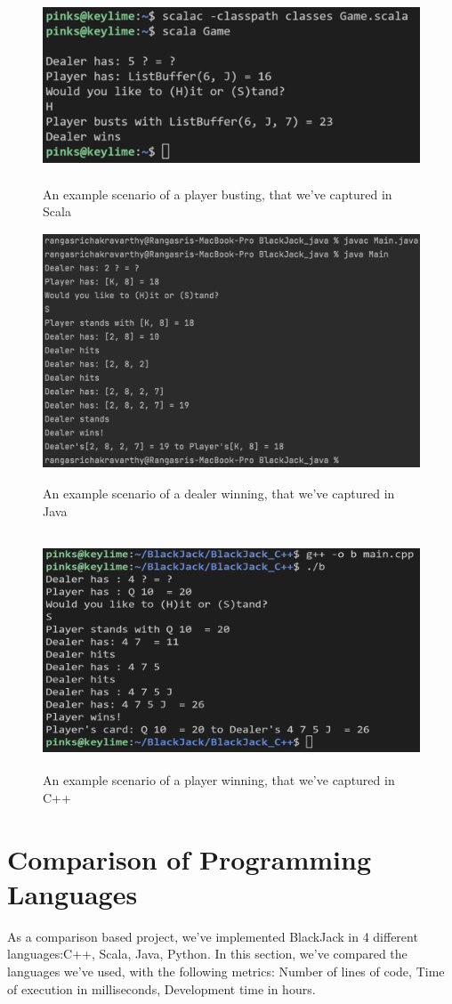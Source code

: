 \documentclass[12pt]{article}
\begin{document}
\begin{figure}[ht!] 
\centering
\includegraphics[height=5cm, width=15cm]{Scala.png}
\caption{An example scenario of a player busting, that we've captured in Scala}

\includegraphics[height=7cm, width=15cm]{Java.png}
\caption{An example scenario of a dealer winning, that we've captured in Java}

\includegraphics[height=7cm, width=15cm]{CPP.png}
\caption{An example scenario of a player winning, that we've captured in C++}
\end{figure}

\pagebreak


\section{Comparison of Programming Languages}
As a comparison based project, we've implemented BlackJack in 4 different languages:C++, Scala, Java, Python. In this section, we've compared the languages we've used, with the following metrics: Number of lines of code, Time of execution in milliseconds, Development time in hours.
\end{document}
